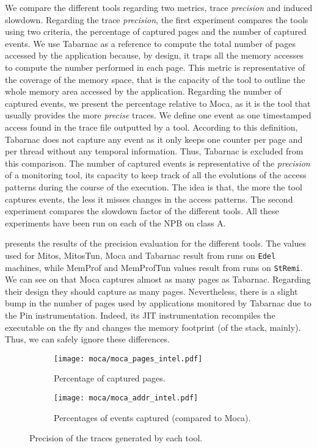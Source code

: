 We compare the different tools regarding two metrics, trace \emph{precision} and induced slowdown.
Regarding the trace \emph{precision}, the first experiment compares the tools using two criteria, the percentage of captured pages and the number of captured events.
We use \gls{Tabarnac} as a reference to compute the total number of pages accessed by the application because, by design, it traps all the memory accesses to compute the number performed in each page.
This metric is representative of the coverage of the memory space, that is the capacity of the tool to outline the whole memory area accessed by the application.
Regarding the number of captured events, we present the percentage relative to \gls{Moca}, as it is the tool that usually provides the more \emph{precise} traces.
We define one event as one timestamped access found in the trace file outputted by a tool.
According to this definition, \gls{Tabarnac} does not capture any event as it only keeps one counter per page and per thread without any temporal information.
Thus, \gls{Tabarnac} is excluded from this comparison.
The number of captured events is representative of the \emph{precision} of a monitoring tool, its capacity to keep track of all the evolutions of the access patterns during the course of the execution.
The idea is that, the more the tool captures events, the less it misses changes in the access patterns.
The second experiment compares the slowdown factor of the different tools.
All these experiments have been run on each of the \gls{NPB} on class A.

 presents the results of the precision evaluation for the different tools.
The values used for \gls{Mitos}, MitosTun, \gls{Moca} and \gls{Tabarnac} result from runs on \texttt{Edel} machines, while \gls{MemProf} and MemProfTun values result from runs on \texttt{StRemi}.
We can see on  that \gls{Moca} captures almost as many pages as \gls{Tabarnac}.
Regarding their design they should capture as many pages.
Nevertheless, there is a slight bump in the number of pages used by applications monitored by \gls{Tabarnac} due to the Pin instrumentation.
Indeed, its JIT instrumentation recompiles the executable on the fly and changes the memory footprint (of the stack, mainly).
Thus, we can safely ignore these differences.

\begin{figure}[htb]
    \centering
    \begin{subfigure}{.73\linewidth}
        \texttt{[image: moca/moca\_pages\_intel.pdf]}
        \caption{Percentage of captured pages.}
        \label{fig:pages}
    \end{subfigure}
    \begin{subfigure}{.73\linewidth}
        \texttt{[image: moca/moca\_addr\_intel.pdf]}
        \caption{Percentages of events captured (compared to \gls{Moca}).}
        \label{fig:addr}
    \end{subfigure}
    \caption{Precision of the traces generated by each tool.}
    \label{fig:pages-addr}
\end{figure}

